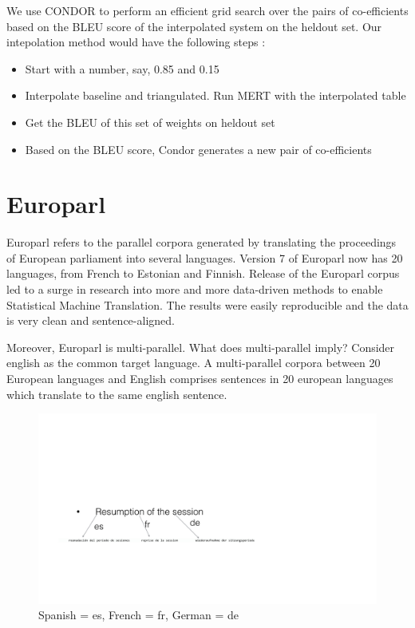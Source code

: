 		We use CONDOR to perform an efficient grid search over the pairs of co-efficients based on the BLEU score of the interpolated system on the heldout set. Our intepolation method would have the following steps : 
 
		\begin{itemize}
			\item Start with a number, say, 0.85 and 0.15
			\item Interpolate baseline and triangulated. Run MERT with the interpolated table
			\item Get the BLEU of this set of weights on heldout set
			\item Based on the BLEU score, Condor generates a new pair of co-efficients
		\end{itemize}



\section{Europarl}
Europarl refers to the parallel corpora generated by translating the proceedings of European parliament into several languages. Version 7 of Europarl now has 20 languages, from French to Estonian and Finnish. Release of the Europarl corpus led to a surge in research into more and more data-driven methods to enable Statistical Machine Translation. The results were easily reproducible and the data is very clean and sentence-aligned. 

Moreover, Europarl is multi-parallel. What does multi-parallel imply? Consider english as the common target language. A multi-parallel corpora between 20 European languages and English comprises sentences in 20 european languages which translate to the same english sentence. 

\begin{figure}[ht]
	\includegraphics[trim=4cm 4cm 4cm 4cm, height=0.5\textheight, clip=true]{files/Figures/eparl_multiparallel.jpg}
	\caption{Spanish = es, French = fr, German = de}
	\label{fig:eparl_multi}
	\small
	\centering
\end{figure}



